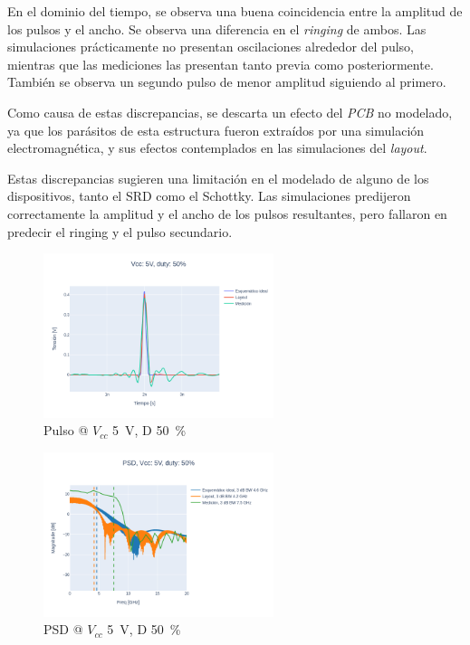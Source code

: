 En el dominio del tiempo, se observa una buena coincidencia entre la amplitud de
los pulsos y el ancho. Se observa una diferencia en el \textit{ringing} de
ambos.  Las simulaciones prácticamente no presentan oscilaciones alrededor del
pulso, mientras que las mediciones las presentan tanto previa como
posteriormente.  También se observa un segundo pulso de menor amplitud siguiendo
al primero.

Como causa de estas discrepancias, se descarta un efecto del \textit{PCB} no
modelado, ya que los parásitos de esta estructura fueron extraídos por una
simulación electromagnética, y sus efectos contemplados en las simulaciones del
\textit{layout}.

Estas  discrepancias sugieren una limitación en el modelado de alguno de los 
dispositivos, tanto el SRD como el Schottky. Las simulaciones predijeron correctamente
la amplitud y el ancho de los pulsos resultantes, pero fallaron en predecir 
el ringing y el pulso secundario.

\begin{figure}
  \centering
    \includegraphics[width=0.6\textwidth]{images/plots/Vcc_5V_duty_50_time_domain.png}
    \caption{Pulso @ $V_{cc}$ \qty{5}{\volt}, D \qty{50}{\percent} }
    \label{fig:plots_5v_50}
\end{figure}

\begin{figure}
  \centering
    \includegraphics[width=0.6\textwidth]{images/plots/Vcc_5V_duty_50_psd.png}
    \caption{PSD @ $V_{cc}$ \qty{5}{\volt}, D \qty{50}{\percent} }
    \label{fig:psd_5v_50}
\end{figure}

